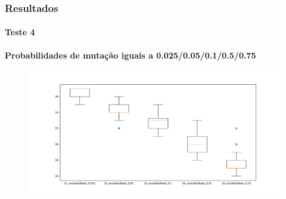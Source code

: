 \documentclass{beamer}
\begin{document}
	\begin{frame}
		\frametitle{Resultados}
		\framesubtitle{Teste 4}
		\textbf{Probabilidades de mutação iguais a 0.025/0.05/0.1/0.5/0.75}
		\begin{figure}[H]
			\includegraphics[scale=0.35]{../relatorio/teste5.pdf}
		\end{figure}
	\end{frame}
	
\end{document}

